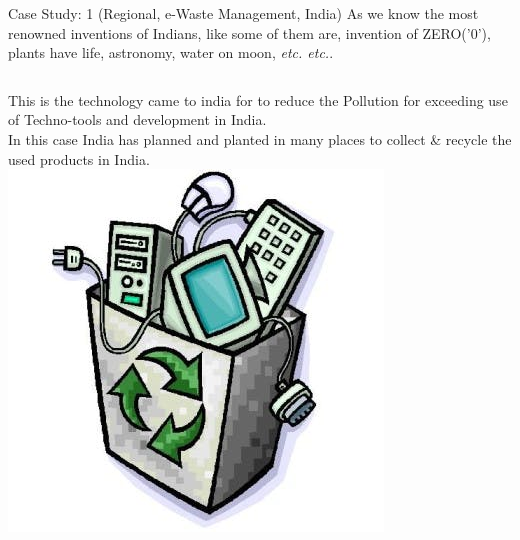 \begin{frame}{Case Study: 1 (Regional, e-Waste Management, India)}
	As we know the most renowned inventions of Indians, like some of them are, invention of ZERO('0'), plants have life, astronomy, water on moon, \textit{etc. etc.}.
\begin{columns}
This is the technology came to india for to reduce the Pollution for exceeding use of Techno-tools and development in India.
\\In this case India has planned and planted in many places to collect \& recycle the used products in India.
\includegraphics[width=\textwidth]{img/eWaste.jpg}
\end{columns}
\end{frame}


